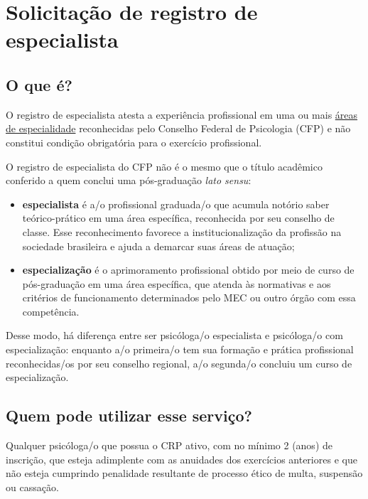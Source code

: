 \chapter{Solicitação de registro de especialista}
\label{chap:pf-especialista}
\vfill

\section{O que é?}
\vfill

O registro de especialista atesta a experiência profissional em uma ou mais \href{https://site.cfp.org.br/servicos/titulo-de-especialista/}{áreas de especialidade} reconhecidas pelo Conselho Federal de Psicologia (CFP) e não constitui condição obrigatória para o exercício profissional.
\vfill

O registro de especialista do CFP não é o mesmo que o título acadêmico conferido a quem conclui uma pós-graduação \emph{lato sensu}:
\vfill

\begin{itemize}
	\item
	\textbf{especialista} é a/o profissional graduada/o que acumula notório saber teórico-prático em uma área específica, reconhecida por seu conselho de classe. Esse reconhecimento favorece a institucionalização da profissão na sociedade brasileira e ajuda a demarcar suas áreas de atuação;
	\item
	\textbf{especialização} é o aprimoramento profissional obtido por meio de curso de pós-graduação em uma área específica, que atenda às normativas e aos critérios de funcionamento determinados pelo MEC ou outro órgão com essa competência.
\end{itemize}
\vfill

Desse modo, há diferença entre ser psicóloga/o especialista e psicóloga/o com especialização: enquanto a/o primeira/o tem sua formação
e prática profissional reconhecidas/os por seu conselho regional, a/o segunda/o concluiu um curso de especialização.
\vfill

\section{Quem pode utilizar esse serviço?}

Qualquer psicóloga/o que possua o CRP ativo, com no mínimo 2 (anos) de inscrição, que esteja adimplente com as anuidades dos exercícios
anteriores e que não esteja cumprindo penalidade resultante de processo ético de multa, suspensão ou cassação.
\vfill


